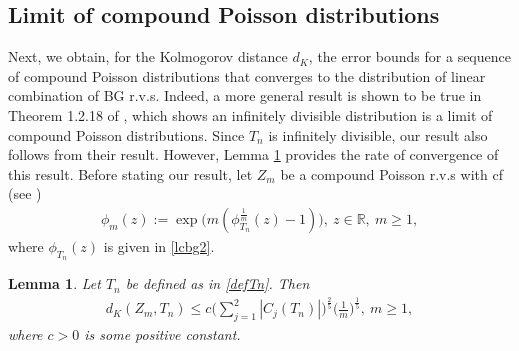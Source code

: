 \documentclass[12pt, a4paper,reqno]{amsart}
\newtheorem{lem}[thm]{Lemma}
\theoremstyle{definition}
\theoremstyle{myremark}
\numberwithin{equation}{section}
\begin{document}
\subsection{Limit of compound Poisson distributions}Next, we obtain, for the Kolmogorov distance $d_K$, the error bounds for a sequence of compound Poisson distributions that converges to the distribution of linear combination of BG r.v.s. Indeed, a more general result is shown to be true  in Theorem 1.2.18 of \cite{apple2009}, which shows an infinitely divisible distribution is a limit of compound Poisson distributions. Since $T_n$ is infinitely divisible, our result also follows from their result. However, Lemma \ref{approxthm1} provides the rate of convergence of this result. Before stating our result, let $Z_m$ be a compound Poisson r.v.s with cf (see \cite[Theorem 1.2.18]{apple2009})
	\begin{align}\label{cpdcf00}
	\phi_{m}(z):= \exp\bigg(m \left( \phi_{T_n}^{\frac{1}{m}}(z)-1  \right)   \bigg),~z\in\mathbb{{R}}, ~m\geq 1,
	\end{align}
	where $\phi_{T_n}(z)$ is given in \eqref{lcbg2}.  
\begin{lem}\label{approxthm1}
	Let $T_n$ be defined as in \eqref{defTn}. Then
	\begin{align}\label{Kbound1}
	d_{K}(Z_m,T_n) \leq c \bigg(\sum_{j=1}^{2}|C_{j}(T_n)|\bigg)^{\frac{2}{5}} \bigg(\frac{1}{m}\bigg)^{\frac{1}{5}},~m\geq 1,
	\end{align}
	where $c>0$ is some positive constant.
\end{lem} 
\end{document}
